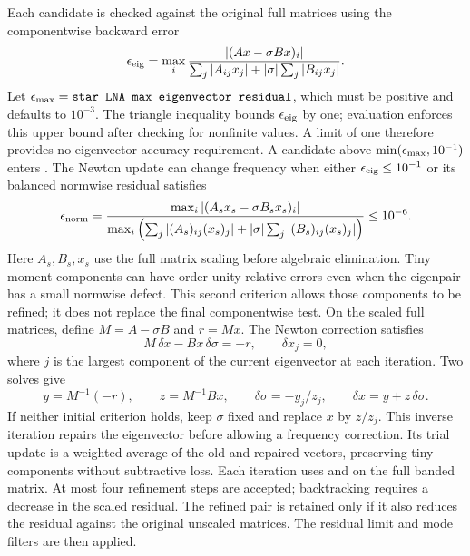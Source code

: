 \documentclass[11pt]{article}
\newcommand{\code}[1]{\texttt{\detokenize{#1}}}
\begin{document}
Each candidate is checked against the original full matrices using the
componentwise backward error
\begin{equation}
  \epsilon_{\rm eig}=
  \max_i\frac{|(Ax-\sigma Bx)_i|}
  {\sum_j|A_{ij}x_j|+|\sigma|\sum_j|B_{ij}x_j|}.
\end{equation}
Let $\epsilon_{\rm max}=\code{star_LNA_max_eigenvector_residual}$, which
must be positive and defaults to $10^{-3}$. The triangle inequality bounds
$\epsilon_{\rm eig}$ by one; evaluation enforces this upper bound after
checking for nonfinite values. A limit of one therefore provides no
eigenvector accuracy requirement. A candidate above
$\min(\epsilon_{\rm max},10^{-1})$ enters \code{refine_star_LNA_eigenpair}.
The Newton update can change frequency when either
$\epsilon_{\rm eig}\leq10^{-1}$ or its balanced normwise residual satisfies
\begin{equation}
 \epsilon_{\rm norm}=
 \frac{\max_i|(A_s x_s-\sigma B_s x_s)_i|}
 {\max_i\left(\sum_j|(A_s)_{ij}(x_s)_j|
       +|\sigma|\sum_j|(B_s)_{ij}(x_s)_j|\right)}\leq10^{-6}.
\end{equation}
Here $A_s,B_s,x_s$ use the full matrix scaling before algebraic elimination.
Tiny moment components can have order-unity relative errors even when the
eigenpair has a small normwise defect. This second criterion allows those
components to be refined; it does not replace the final componentwise test.
On the scaled full matrices, define
$M=A-\sigma B$ and $r=Mx$. The Newton correction satisfies
\begin{equation}
  M\,\delta x-Bx\,\delta\sigma=-r,\qquad\delta x_j=0,
\end{equation}
where $j$ is the largest component of the current eigenvector at each
iteration. Two solves give
\begin{equation}
  y=M^{-1}(-r),\qquad z=M^{-1}Bx,\qquad
  \delta\sigma=-y_j/z_j,\qquad\delta x=y+z\,\delta\sigma.
\end{equation}
If neither initial criterion holds, keep $\sigma$ fixed and replace $x$
by $z/z_j$. This inverse iteration repairs the eigenvector before allowing
a frequency correction. Its trial update is a weighted average of the old
and repaired vectors, preserving tiny components without subtractive loss.
Each iteration uses \code{ZGBTRF} and \code{ZGBTRS} on the full banded
matrix. At most four refinement steps are accepted; backtracking requires a
decrease in the scaled residual. The refined pair is retained only if it also
reduces the residual against the original unscaled matrices. The residual
limit and mode filters are then applied.
\end{document}
